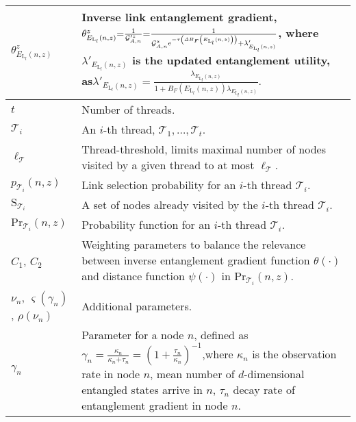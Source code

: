 \documentclass[11pt]{article}%
\begin{document}
\begin{longtable}{|p{1.6in}|p{2.8in}|}
${\theta }^z_{E_{{\mathrm{L}}_l}\left(n,z\right)}$ & Inverse link entanglement gradient, \newline ${\theta }^z_{E_{{\mathrm{L}}_l}\left(n,z\right)}\newline\mathrm{=}\frac{\mathrm{1}}{{\mathcal{G}}'^z_{A,n}}\mathrm{=}\frac{\mathrm{1}}{{\mathcal{G}}^z_{A,n}e^{\mathrm{-}\tau \left(\mathit{\Delta}B_F\left(E_{{\mathrm{L}}_l}\left(n,z\right)\right)\right)}\mathrm{+}{\lambda }'_{E_{{\mathrm{L}}_l}\left(n,z\right)}}$,                         \newline where ${\lambda }'_{E_{{\mathrm{L}}_l}\left(n,z\right)}$ is the updated entanglement utility, as\newline ${\lambda }'_{E_{{\mathrm{L}}_l}\left(n,z\right)}\mathrm{=}\frac{{\lambda }_{E_{{\mathrm{L}}_l}\left(n,z\right)}}{\mathrm{1+}B_F\left(E_{{\mathrm{L}}_l}\left(n,z\right)\right){\lambda }_{E_{{\mathrm{L}}_l}\left(n,z\right)}}.$ \\ \hline 
$t$  & Number of threads. \\ \hline 
${\mathcal{T}}_i$ & An $i$-th thread, ${\mathcal{T}}_{\mathrm{1}}\mathrm{,\dots ,}{\mathcal{T}}_t$. \\ \hline 
${\ell }_{\mathcal{T}}$ & Thread-threshold, limits maximal number of nodes visited by a given thread to at most ${\ell }_{\mathcal{T}}$. \\ \hline 
$p_{{\mathcal{T}}_i}\left(n,z\right)$ & Link selection probability for an $i$-th thread ${\mathcal{T}}_i$. \\ \hline 
${\mathrm{S}}_{{\mathcal{T}}_i}$ & A set of nodes already visited by the $i$-th thread ${\mathcal{T}}_i$. \\ \hline 
$\mathrm{P}{\mathrm{r}}_{{\mathcal{T}}_i}\left(n,z\right)$ & Probability function for an $i$-th thread ${\mathcal{T}}_i$. \\ \hline 
$C_{\mathrm{1}}$, $C_{\mathrm{2}}$ & Weighting parameters to balance the relevance between inverse entanglement gradient function $\theta \left(\mathrm{\cdot }\right)$ and distance function $\psi \left(\mathrm{\cdot }\right)$ in $\mathrm{P}{\mathrm{r}}_{{\mathcal{T}}_i}\left(n,z\right)$. \\ \hline 
${\nu }_n$, $\varsigma \left({\gamma }_n\right)$, $\rho \left({\nu }_n\right)$ & Additional parameters. \\ \hline 
${\gamma }_n$ & Parameter for a node $n$, defined as \newline ${\gamma }_n\mathrm{=}\frac{{\kappa }_n}{{\kappa }_n\mathrm{+}{\tau }_n}\mathrm{=}{\left(\mathrm{1+}\frac{{\tau }_n}{{\kappa }_n}\right)}^{\mathrm{-}\mathrm{1}}$,\newline where ${\kappa }_n$ is the observation rate in node $n$, mean number of $d$-dimensional entangled states arrive in $n$, ${\tau }_n$ decay rate of entanglement gradient in node $n$.  \\ \hline 

\end{longtable}
\end{document}
